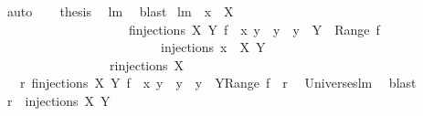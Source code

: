 \begin{isabellebody}
\ auto\isacommand{{\isacharbraceright}}\isamarkupfalse%
\isanewline
\ \ \isamarkupfalse%
\ {\isacharquery}thesis\ \isamarkupfalse%
\ lm{}{}\ \isamarkupfalse%
\ blast\isanewline
{}\isamarkupfalse%
%
\endisatagproof
{\isafoldproof}%
%
\isadelimproof
\isanewline
%
\endisadelimproof
\isanewline
{}\isamarkupfalse%
\ lm{}{}{\isacharcolon}\ \ {\isachardoublequoteopen}x\ {\isasymnotin}\ X{\isachardoublequoteclose}\ \isanewline
\ \ \ \ \ \ \ \ \ \ \ \ \ \ \ \ \ \ \ {\isachardoublequoteopen}{\isacharparenleft}{\isasymUnion}\ f{\isasymin}injections\ X\ Y{\isachardot}\ {\isacharbraceleft}f\ {\isasymunion}\ {\isacharbraceleft}{\isacharparenleft}x{\isacharcomma}\ y{\isacharparenright}{\isacharbraceright}\ {\isacharbar}\ y\ {\isachardot}\ y\ {\isasymin}\ Y\ {\isacharminus}\ {\isacharparenleft}Range\ f{\isacharparenright}{\isacharbraceright}{\isacharparenright}\ {\isacharequal}\ \isanewline
\ \ \ \ \ \ \ \ \ \ \ \ \ \ \ \ \ \ \ \ \ \ \ \ \ injections\ {\isacharparenleft}{\isacharbraceleft}x{\isacharbraceright}\ {\isasymunion}\ X{\isacharparenright}\ Y{\isachardoublequoteclose}\ \isanewline
\ \ \ \ \ \ \ \ \ \ \ \ \ \ \ \ {\isacharparenleft}\ {\isachardoublequoteopen}{\isacharquery}r{\isacharequal}injections\ {\isacharquery}X\ {\isacharunderscore}{\isachardoublequoteclose}{\isacharparenright}\ \isanewline
%
\isadelimproof
%
\endisadelimproof
%
\isatagproof
{}\isamarkupfalse%
\ {\isacharminus}\ \isanewline
\ \ \isamarkupfalse%
\ \isanewline
\ \ {}{\isacharcolon}\ {\isachardoublequoteopen}{\isacharquery}r{\isacharequal}{\isacharparenleft}{\isasymUnion}\ f{\isasymin}injections{\isacharprime}\ X\ Y{\isachardot}\ {\isacharbraceleft}f\ {\isasymunion}\ {\isacharbraceleft}{\isacharparenleft}x{\isacharcomma}\ y{\isacharparenright}{\isacharbraceright}\ {\isacharbar}\ y\ {\isachardot}\ y\ {\isasymin}\ Y{\isacharminus}Range\ f{\isacharbraceright}{\isacharparenright}{\isachardoublequoteclose}\ {\isacharparenleft}\ {\isachardoublequoteopen}{\isacharunderscore}{\isacharequal}{\isacharquery}r{\isacharprime}{\isachardoublequoteclose}{\isacharparenright}\ \isamarkupfalse%
\ Universes{\isachardot}lm{}{}\ \isamarkupfalse%
\ blast\ \isanewline
\ \ \isamarkupfalse%
\ {\isachardoublequoteopen}{\isacharquery}r{\isacharprime}\ {\isasymsubseteq}\ injections{\isacharprime}\ {\isacharquery}X\ Y{\isachardoublequoteclose}\ \isamarkupfalse%

\end{isabellebody}
